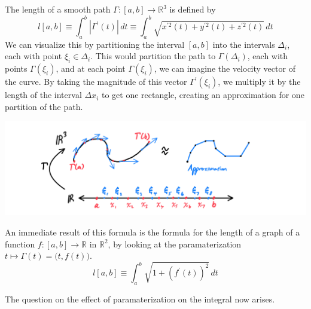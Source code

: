 \documentclass{article}
\begin{document}
      \begin{definition}
        The length of a smooth path $\Gamma: [a, b] \longrightarrow \mathbb{R}^3$ is defined by 
        \[l[a, b] \equiv \int_a^b |\Gamma^\prime (t)|\,dt \equiv \int_a^b \sqrt{x^{\prime 2} (t) + y^{\prime 2} (t) + z^{\prime 2} (t)}\, dt\]
        We can visualize this by partitioning the interval $[a, b]$ into the intervals $\Delta_i$, each with point $\xi_i \in \Delta_i$. This would partition the path to $\Gamma(\Delta_i)$, each with points $\Gamma(\xi_i)$, and at each point $\Gamma(\xi_i)$, we can imagine the velocity vector of the curve. By taking the magnitude of this vector $\Gamma^\prime (\xi_i)$, we multiply it by the length of the interval $\Delta x_i$ to get one rectangle, creating an approximation for one partition of the path. 
        \begin{center}
            \includegraphics[scale=0.25]{img/Arc_Length_Integral.PNG}
        \end{center}
        An immediate result of this formula is the formula for the length of a graph of a function $f: [a, b] \longrightarrow \mathbb{R}$ in $\mathbb{R}^2$, by looking at the paramaterization $t \mapsto \Gamma(t) = \big(t, f(t)\big)$. 
        \[l[a,b] \equiv \int_a^b \sqrt{1 + (f^\prime (t))^2}\,dt\]
      \end{definition}

      The question on the effect of paramaterization on the integral now arises. 
\end{document}
